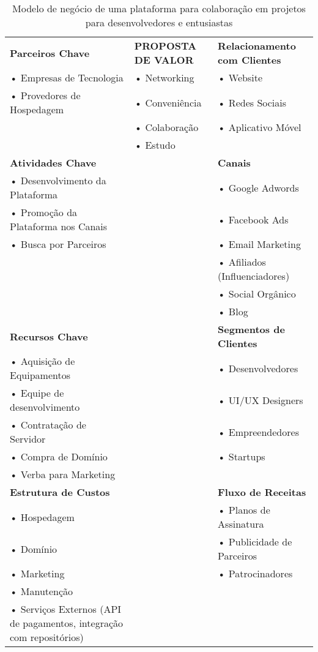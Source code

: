 \documentclass{article}
\begin{document}
\begin{table}[H]
\centering
\caption{Modelo de negócio de uma plataforma para colaboração em projetos para desenvolvedores e entusiastas}
\renewcommand{\arraystretch}{1.8}
\setlength{\tabcolsep}{4pt}
\begin{tabular}{|p{6cm}|p{6cm}|p{6cm}|}
\hline
\rowcolor{lightgray}
\textbf{Parceiros Chave} &
\centering\textbf{PROPOSTA DE VALOR} &
\textbf{Relacionamento com Clientes} \\
\cline{1-1}\cline{2-2}\cline{3-3}
• Empresas de Tecnologia & • Networking & • Website \\
• Provedores de Hospedagem & • Conveniência & • Redes Sociais \\
& • Colaboração & • Aplicativo Móvel \\
& • Estudo & \\
\hline
\rowcolor{lightgray}
\textbf{Atividades Chave} & & \textbf{Canais} \\
\cline{1-1}\cline{2-2}\cline{3-3}
• Desenvolvimento da Plataforma & & • Google Adwords \\
• Promoção da Plataforma nos Canais & & • Facebook Ads \\
• Busca por Parceiros & & • Email Marketing \\
& & • Afiliados (Influenciadores) \\
& & • Social Orgânico \\
& & • Blog \\
\hline
\rowcolor{lightgray}
\textbf{Recursos Chave} & & \textbf{Segmentos de Clientes} \\
\cline{1-1}\cline{2-2}\cline{3-3}
• Aquisição de Equipamentos & & • Desenvolvedores \\
• Equipe de desenvolvimento & & • UI/UX Designers \\
• Contratação de Servidor & & • Empreendedores \\
• Compra de Domínio & & • Startups \\
• Verba para Marketing & & \\
\hline
\rowcolor{lightgray}
\textbf{Estrutura de Custos} & & \textbf{Fluxo de Receitas} \\
\hline
• Hospedagem & & • Planos de Assinatura \\
• Domínio & & • Publicidade de Parceiros \\
• Marketing & & • Patrocinadores \\
• Manutenção & & \\
• Serviços Externos (API de pagamentos, integração com repositórios) & & \\
\hline
\end{tabular}
\end{table}
\end{document}
